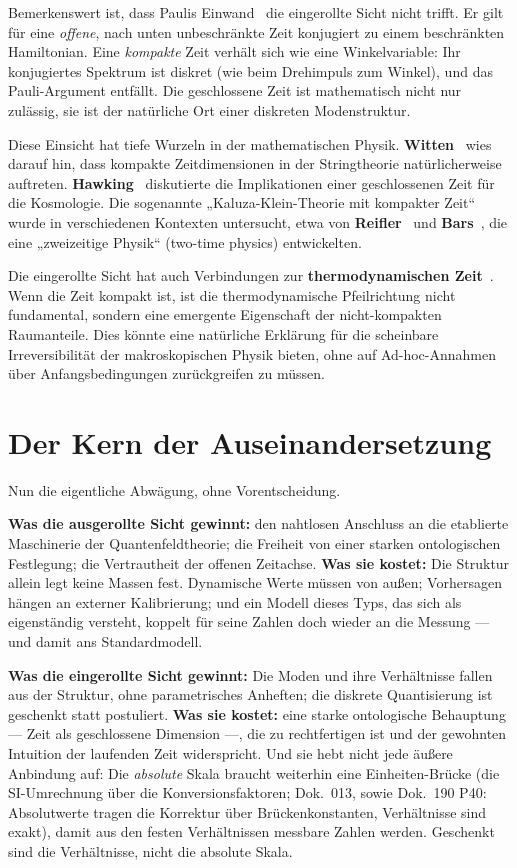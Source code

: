 \documentclass[11pt,a4paper]{article}
\begin{document}
Bemerkenswert ist, dass Paulis Einwand~\cite{Pauli1933} die eingerollte Sicht nicht trifft. Er gilt für eine \emph{offene}, nach unten unbeschränkte Zeit konjugiert zu einem beschränkten Hamiltonian. Eine \emph{kompakte} Zeit verhält sich wie eine Winkelvariable: Ihr konjugiertes Spektrum ist diskret (wie beim Drehimpuls zum Winkel), und das Pauli-Argument entfällt. Die geschlossene Zeit ist mathematisch nicht nur zulässig, sie ist der natürliche Ort einer diskreten Modenstruktur.

Diese Einsicht hat tiefe Wurzeln in der mathematischen Physik. \textbf{Witten}~\cite{Witten1983} wies darauf hin, dass kompakte Zeitdimensionen in der Stringtheorie natürlicherweise auftreten. \textbf{Hawking}~\cite{Hawking1984} diskutierte die Implikationen einer geschlossenen Zeit für die Kosmologie. Die sogenannte „Kaluza-Klein-Theorie mit kompakter Zeit`` wurde in verschiedenen Kontexten untersucht, etwa von \textbf{Reifler}~\cite{Reifler1992} und \textbf{Bars}~\cite{Bars1997,Bars2012}, die eine „zweizeitige Physik`` (two-time physics) entwickelten.

Die eingerollte Sicht hat auch Verbindungen zur \textbf{thermodynamischen Zeit}~\cite{ConnesRovelli1994}. Wenn die Zeit kompakt ist, ist die thermodynamische Pfeilrichtung nicht fundamental, sondern eine emergente Eigenschaft der nicht-kompakten Raumanteile. Dies könnte eine natürliche Erklärung für die scheinbare Irreversibilität der makroskopischen Physik bieten, ohne auf Ad-hoc-Annahmen über Anfangsbedingungen zurückgreifen zu müssen.

\section{Der Kern der Auseinandersetzung}

Nun die eigentliche Abwägung, ohne Vorentscheidung.

\textbf{Was die ausgerollte Sicht gewinnt:} den nahtlosen Anschluss an die etablierte Maschinerie der Quantenfeldtheorie; die Freiheit von einer starken ontologischen Festlegung; die Vertrautheit der offenen Zeitachse. \textbf{Was sie kostet:} Die Struktur allein legt keine Massen fest. Dynamische Werte müssen von außen; Vorhersagen hängen an externer Kalibrierung; und ein Modell dieses Typs, das sich als eigenständig versteht, koppelt für seine Zahlen doch wieder an die Messung --- und damit ans Standardmodell.

\textbf{Was die eingerollte Sicht gewinnt:} Die Moden und ihre Verhältnisse fallen aus der Struktur, ohne parametrisches Anheften; die diskrete Quantisierung ist geschenkt statt postuliert. \textbf{Was sie kostet:} eine starke ontologische Behauptung --- Zeit als geschlossene Dimension ---, die zu rechtfertigen ist und der gewohnten Intuition der laufenden Zeit widerspricht. Und sie hebt nicht jede äußere Anbindung auf: Die \emph{absolute} Skala braucht weiterhin eine Einheiten-Brücke (die SI-Umrechnung über die Konversionsfaktoren; Dok.~013, sowie Dok.~190 P40: Absolutwerte tragen die Korrektur über Brückenkonstanten, Verhältnisse sind exakt), damit aus den festen Verhältnissen messbare Zahlen werden. Geschenkt sind die Verhältnisse, nicht die absolute Skala.
\end{document}
